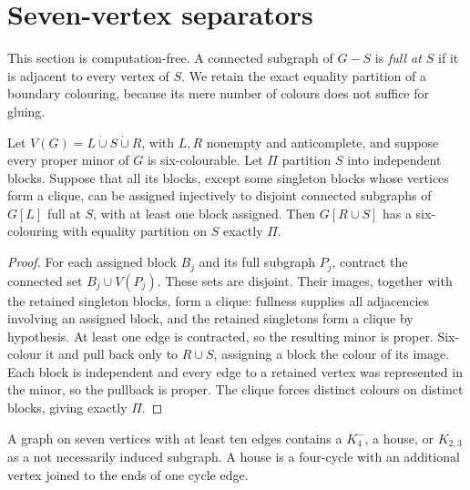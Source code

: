 \section{Seven-vertex separators}\label{sec:seven-cuts}

This section is computation-free.  A connected subgraph of $G-S$ is
\emph{full at $S$} if it is adjacent to every vertex of $S$.
We retain the exact equality partition of a boundary colouring, because
its mere number of colours does not suffice for gluing.

\begin{lemma}\label{lem:reflection}
Let $V(G)=L\mathbin{\dot\cup}S\mathbin{\dot\cup}R$, with $L,R$ nonempty
and anticomplete, and suppose every proper minor of $G$ is six-colourable.
Let $\Pi$ partition $S$ into independent blocks.  Suppose that all its
blocks, except some singleton blocks whose vertices form a clique, can
be assigned injectively to disjoint connected subgraphs of $G[L]$ full
at $S$, with at least one block assigned.  Then $G[R\cup S]$ has a
six-colouring with equality partition on $S$ exactly $\Pi$.
\end{lemma}

\begin{proof}
For each assigned block $B_j$ and its full subgraph $P_j$, contract the
connected set $B_j\cup V(P_j)$.  These sets are disjoint.  Their images,
together with the retained singleton blocks, form a clique: fullness
supplies all adjacencies involving an assigned block, and the retained
singletons form a clique by hypothesis.  At least one edge is contracted,
so the resulting minor is proper.  Six-colour it and pull back only to
$R\cup S$, assigning a block the colour of its image.  Each block is
independent and every edge to a retained vertex was represented in the
minor, so the pullback is proper.  The clique forces distinct colours on
distinct blocks, giving exactly $\Pi$.
\end{proof}

\begin{lemma}\label{lem:seven-small}
A graph on seven vertices with at least ten edges contains a $K_4^{-}$,
a house, or $K_{2,3}$ as a not necessarily induced subgraph.  A house is
a four-cycle with an additional vertex joined to the ends of one cycle
edge.
\end{lemma}

